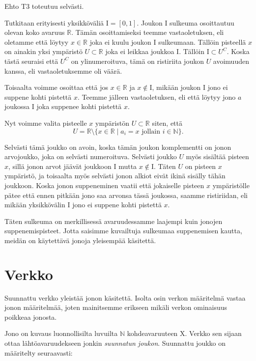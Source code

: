 \documentclass[12pt,a4paper,leqno]{report}
\newcommand{\R}{\mathbb{R}}
\newcommand{\N}{\mathbb{N}}
\newcommand{\X}{\mathrm{X}}
\newcommand{\I}{\mathrm{I}}
\theoremstyle{plain}
\theoremstyle{definition}
\theoremstyle{remark}
\begin{document}
Ehto T3 toteutuu selvästi.

Tutkitaan erityisesti yksikköväliä $\I = [0,1]$. Joukon $\I$ sulkeuma osoittautuu olevan koko avaruus $\R$. Tämän osoittamiseksi teemme vastaoletuksen, eli oletamme että löytyy $x \in \R$ joka ei kuulu joukon $\I$ sulkeumaan. Tällöin pisteellä $x$ on ainakin yksi ympäristö $U \subset \R$ joka ei leikkaa joukkoa $\I$. Tällöin $\I \subset U^C$. Koska tästä seuraisi että $U^C$ on ylinumeroituva, tämä on ristiriita joukon $U$ avoimuuden kanssa, eli vastaoletuksemme oli väärä.

Toisaalta voimme osoittaa että jos $x \in \R$ ja $x \not\in \I$, mikään joukon $\I$ jono ei suppene kohti pistettä $x$. Teemme jälleen vastaoletuksen, eli että löytyy jono $a$ joukossa $\I$ joka suppenee kohti pistettä $x$.

Nyt voimme valita pisteelle $x$ ympäristön $U \subset \R$ siten, että
\begin{equation}
U = \R \setminus \{x \in \R \mid a_i = x \text{ jollain } i \in \N \}\text{.}
\end{equation}

Selvästi tämä joukko on avoin, koska tämän joukon komplementti on jonon arvojoukko, joka on selvästi numeroituva. Selvästi joukko $U$ myös sisältää pisteen $x$, sillä jonon arvot jäävät joukkoon $\I$ mutta $x \not\in \I$. Täten $U$ on pisteen $x$ ympäristö, ja toisaalta myös selvästi jonon alkiot eivät ikinä sisälly tähän joukkoon. Koska jonon suppeneminen vaatii että jokaiselle pisteen $x$ ympäristölle pätee että ennen pitkään jono saa arvonsa tässä joukossa, saamme ristiriidan, eli mikään yksikkövälin $\I$ jono ei suppene kohti pistettä $x$.

Täten sulkeuma on merkillisessä avaruudessamme laajempi kuin jonojen suppenemispisteet. Jotta saisimme kuvailtuja sulkeumaa suppenemisen kautta, meidän on käytettävä jonoja yleisempää käsitettä.

\chapter{Verkko}

Suunnattu verkko yleistää jonon käsitettä. Isolta osin verkon määritelmä vastaa jonon määritelmää, joten mainitsemme erikseen mikäli verkon ominaisuus poikkeaa jonosta.

Jono on kuvaus luonnollisilta luvuilta $\N$ kohdeavaruuteen $\X$. Verkko sen sijaan ottaa lähtöavaruudekseen jonkin \emph{suunnatun joukon}. Suunnattu joukko on määritelty seuraavasti:
\end{document}
